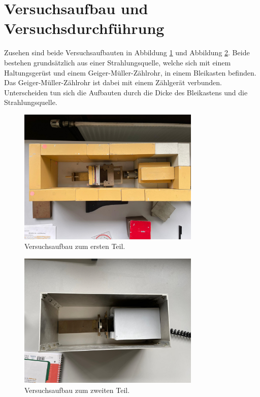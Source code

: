 \section{Versuchsaufbau und Versuchsdurchführung}

\begin{flushleft}
    Zusehen sind beide Versuchsaufbauten in Abbildung \ref{Abbildung4} und Abbildung \ref{Abbildung5}.
    Beide bestehen grundsätzlich aus einer Strahlungsquelle, welche sich mit einem Haltungsgerüst und einem Geiger-Müller-Zählrohr, in einem Bleikasten befinden. 
    Das Geiger-Müller-Zählrohr ist dabei mit einem Zählgerät verbunden. 
    Unterscheiden tun sich die Aufbauten durch die Dicke des Bleikastens und die Strahlungsquelle.      
\end{flushleft}

\begin{figure}[H]
    \centering
    \includegraphics[height=65mm]{bilder/Auf1.jpeg}
    \caption{Versuchsaufbau zum ersten Teil. \label{Abbildung4} }
\end{figure}

\begin{figure}[H]
    \centering
    \includegraphics[height=65mm]{bilder/Auf2.jpeg}
    \caption{Versuchsaufbau zum zweiten Teil. \label{Abbildung5} }
\end{figure}

